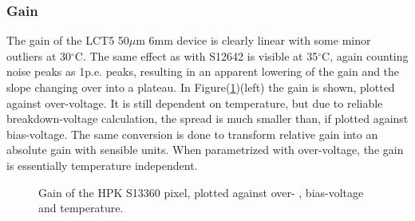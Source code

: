 \documentclass[12pt,article,type=msc,colorback,accentcolor=tud9c]{tudthesis}
\begin{document}
\subsubsection{Gain}


The gain of the LCT5 50$\mu$m 6mm device is clearly linear with some minor outliers at 30$^{\circ}$C.  The same effect as with S12642 is visible at 35$^{\circ}$C, again counting noise peaks as 1p.e. peaks, resulting in an apparent lowering of the gain and the slope changing over into a plateau. In Figure(\ref{fig:S13360_Gain})(left) the gain is shown, plotted against over-voltage. It is still dependent on temperature, but due to reliable breakdown-voltage calculation, the spread is much smaller than, if plotted against bias-voltage. The same conversion is done to transform relative gain into an absolute gain with sensible units. When parametrized with over-voltage, the gain is essentially temperature independent.
\begin{figure}[h]
\begin{centering}
\caption[LCT5 6mm gain]{Gain of the HPK S13360 pixel, plotted against over- , bias-voltage and temperature. }
\label{fig:S13360_Gain}
\end{centering}
\end{figure}
\end{document}
